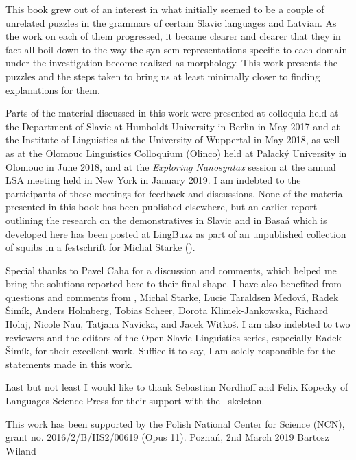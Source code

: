 
This book grew out of an interest in what initially seemed to be a couple of unrelated puzzles in the grammars of certain Slavic languages and Latvian. As the work on each of them progressed, it became clearer and clearer that they in fact all boil down to the way the syn-sem representations specific to each domain under the investigation become realized as morphology. This work presents the puzzles and the steps taken to bring us at least minimally closer to finding explanations for them.
\par
Parts of the material discussed in this work were presented at colloquia held at the Department of Slavic at Humboldt University in Berlin in May 2017 and at the Institute of Linguistics at the University of Wuppertal in May 2018, as well as at the Olomouc Linguistics Colloquium (Olinco) held at Palack\'y University in Olomouc in June 2018, and at the \textit{Exploring Nanosyntax} session at the annual LSA meeting held in New York in January 2019. I am indebted to the participants of these meetings for feedback and discussions. None of the material presented in this book has been published elsewhere, but an earlier report outlining the research on the demonstratives in Slavic and in Basa\'a which is developed here has been posted at LingBuzz as part of an unpublished collection of squibs in a festschrift for Michal Starke (\citealt{WilandTUM}). 
\par 
Special thanks to  Pavel Caha for a discussion and comments, which helped me bring the solutions reported here to their final shape.
I have also benefited from questions and comments from , Michal Starke,   Lucie Taraldsen Medov\'a,   Radek \v{S}im\'ik,   Anders Holmberg,  Tobias Scheer,   Dorota Klimek-Jankowska,  Richard Holaj,  Nicole Nau,   Tatjana Navicka, and  Jacek Witko\'s. I am also indebted to two reviewers and the editors of the Open Slavic Linguistics series, especially Radek \v{S}im\'ik, for their excellent work. Suffice it to say, I am solely responsible for the statements made in this work. 
\par
Last but not least I would like to thank  Sebastian Nordhoff  and Felix Kopecky  of Languages Science Press for their support with the \XeLaTeX \ skeleton.
 \par
 This work has been supported by the Polish National Center for Science (NCN), grant no. 2016/2/B/HS2/00619 (Opus 11).
\bigbreak
\noindent 
Pozna\'n, 2nd March 2019 \hfill Bartosz Wiland


\begin{refsection}
\printbibliography[heading=subbibliography]
\end{refsection}

